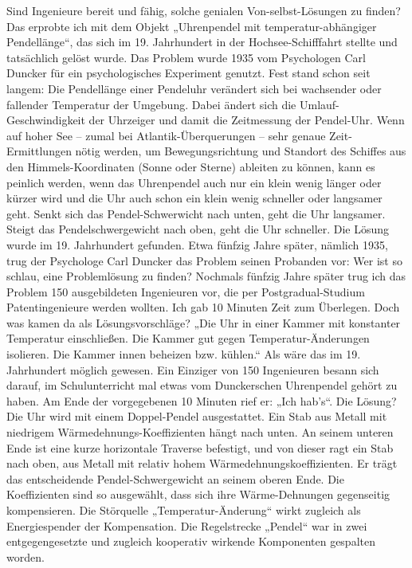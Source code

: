 \documentclass[12pt,a4paper]{article}
\begin{document}
Sind Ingenieure bereit und fähig, solche genialen Von-selbst-Lösungen zu
finden? Das erprobte ich mit dem Objekt „Uhrenpendel mit temperatur-abhängiger
Pendellänge“, das sich im 19. Jahrhundert in der Hochsee-Schifffahrt stellte
und tatsächlich gelöst wurde. Das Problem wurde 1935 vom Psychologen Carl
Duncker für ein psychologisches Experiment genutzt. Fest stand schon seit
langem: Die Pendellänge einer Pendeluhr verändert sich bei wachsender oder
fallender Temperatur der Umgebung. Dabei ändert sich die
Umlauf-Geschwindigkeit der Uhrzeiger und damit die Zeitmessung der
Pendel-Uhr. Wenn auf hoher See – zumal bei Atlantik-Überquerungen -- sehr
genaue Zeit-Ermittlungen nötig werden, um Bewegungsrichtung und Standort des
Schiffes aus den Himmels-Koordinaten (Sonne oder Sterne) ableiten zu können,
kann es peinlich werden, wenn das Uhrenpendel auch nur ein klein wenig länger
oder kürzer wird und die Uhr auch schon ein klein wenig schneller oder
langsamer geht. Senkt sich das Pendel-Schwerwicht nach unten, geht die Uhr
langsamer. Steigt das Pendelschwergewicht nach oben, geht die Uhr
schneller. Die Lösung wurde im 19. Jahrhundert gefunden. Etwa fünfzig Jahre
später, nämlich 1935, trug der Psychologe Carl Duncker das Problem seinen
Probanden vor: Wer ist so schlau, eine Problemlösung zu finden? Nochmals
fünfzig Jahre später trug ich das Problem 150 ausgebildeten Ingenieuren vor,
die per Postgradual-Studium Patentingenieure werden wollten. Ich gab 10
Minuten Zeit zum Überlegen. Doch was kamen da als Lösungsvorschläge? „Die Uhr
in einer Kammer mit konstanter Temperatur einschließen. Die Kammer gut gegen
Temperatur-Änderungen isolieren. Die Kammer innen beheizen bzw. kühlen.“ Als
wäre das im 19. Jahrhundert möglich gewesen. Ein Einziger von 150 Ingenieuren
besann sich darauf, im Schulunterricht mal etwas vom Dunckerschen Uhrenpendel
gehört zu haben. Am Ende der vorgegebenen 10 Minuten rief er: „Ich hab's“. Die
Lösung? Die Uhr wird mit einem Doppel-Pendel ausgestattet. Ein Stab aus Metall
mit niedrigem Wärmedehnungs-Koeffizienten hängt nach unten. An seinem unteren
Ende ist eine kurze horizontale Traverse befestigt, und von dieser ragt ein
Stab nach oben, aus Metall mit relativ hohem Wärmedehnungskoeffizienten. Er
trägt das entscheidende Pendel-Schwergewicht an seinem oberen Ende. Die
Koeffizienten sind so ausgewählt, dass sich ihre Wärme-Dehnungen gegenseitig
kompensieren. Die Störquelle „Temperatur-Änderung“ wirkt zugleich als
Energiespender der Kompensation. Die Regelstrecke „Pendel“ war in zwei
entgegengesetzte und zugleich kooperativ wirkende Komponenten gespalten
worden.
\end{document}
